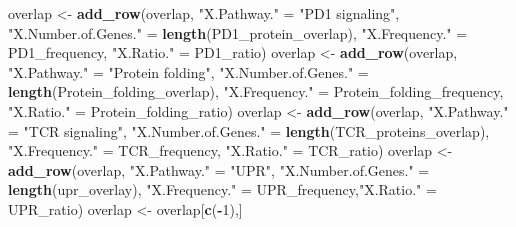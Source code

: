 \documentclass[]{article}
\newenvironment{Shaded}{\begin{snugshade}}{\end{snugshade}}
\newcommand{\DecValTok}[1]{\textcolor[rgb]{0.00,0.00,0.81}{#1}}
\newcommand{\KeywordTok}[1]{\textcolor[rgb]{0.13,0.29,0.53}{\textbf{#1}}}
\newcommand{\NormalTok}[1]{#1}
\newcommand{\OperatorTok}[1]{\textcolor[rgb]{0.81,0.36,0.00}{\textbf{#1}}}
\newcommand{\StringTok}[1]{\textcolor[rgb]{0.31,0.60,0.02}{#1}}
\begin{document}
\begin{Shaded}
\begin{Highlighting}[]
\NormalTok{overlap <-}\StringTok{ }\KeywordTok{add_row}\NormalTok{(overlap, }\StringTok{"X.Pathway."}\NormalTok{ =}\StringTok{ "PD1 signaling"}\NormalTok{,}
                   \StringTok{"X.Number.of.Genes."}\NormalTok{ =}\StringTok{ }\KeywordTok{length}\NormalTok{(PD1_protein_overlap),}
                   \StringTok{"X.Frequency."}\NormalTok{ =}\StringTok{ }\NormalTok{PD1_frequency, }\StringTok{"X.Ratio."}\NormalTok{ =}\StringTok{ }\NormalTok{PD1_ratio)}
\NormalTok{overlap <-}\StringTok{ }\KeywordTok{add_row}\NormalTok{(overlap, }\StringTok{"X.Pathway."}\NormalTok{ =}\StringTok{ "Protein folding"}\NormalTok{,}
                   \StringTok{"X.Number.of.Genes."}\NormalTok{ =}\StringTok{ }\KeywordTok{length}\NormalTok{(Protein_folding_overlap),}
                   \StringTok{"X.Frequency."}\NormalTok{ =}\StringTok{ }\NormalTok{Protein_folding_frequency, }\StringTok{"X.Ratio."}\NormalTok{ =}\StringTok{ }\NormalTok{Protein_folding_ratio)}
\NormalTok{overlap <-}\StringTok{ }\KeywordTok{add_row}\NormalTok{(overlap, }\StringTok{"X.Pathway."}\NormalTok{ =}\StringTok{ "TCR signaling"}\NormalTok{,}
                   \StringTok{"X.Number.of.Genes."}\NormalTok{ =}\StringTok{ }\KeywordTok{length}\NormalTok{(TCR_proteins_overlap), }
                   \StringTok{"X.Frequency."}\NormalTok{ =}\StringTok{ }\NormalTok{TCR_frequency, }\StringTok{"X.Ratio."}\NormalTok{ =}\StringTok{ }\NormalTok{TCR_ratio)}
\NormalTok{overlap <-}\StringTok{ }\KeywordTok{add_row}\NormalTok{(overlap, }\StringTok{"X.Pathway."}\NormalTok{ =}\StringTok{ "UPR"}\NormalTok{,}
                   \StringTok{"X.Number.of.Genes."}\NormalTok{ =}\StringTok{ }\KeywordTok{length}\NormalTok{(upr_overlay),}
                   \StringTok{"X.Frequency."}\NormalTok{ =}\StringTok{ }\NormalTok{UPR_frequency,}\StringTok{"X.Ratio."}\NormalTok{ =}\StringTok{ }\NormalTok{UPR_ratio)}
\NormalTok{overlap <-}\StringTok{ }\NormalTok{overlap[}\KeywordTok{c}\NormalTok{(}\OperatorTok{-}\DecValTok{1}\NormalTok{),]}



\end{Highlighting}
\end{Shaded}
\end{document}
